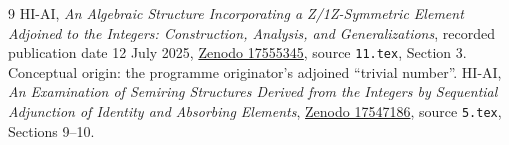 \documentclass[11pt]{article}
\begin{document}
\begin{thebibliography}{9}
 HI-AI, \emph{An Algebraic Structure Incorporating a Z/1Z-Symmetric Element Adjoined to the Integers: Construction, Analysis, and Generalizations}, recorded publication date 12 July 2025, \href{https://zenodo.org/records/17555345}{Zenodo 17555345}, source \texttt{11.tex}, Section 3. Conceptual origin: the programme originator's adjoined ``trivial number''.
 HI-AI, \emph{An Examination of Semiring Structures Derived from the Integers by Sequential Adjunction of Identity and Absorbing Elements}, \href{https://zenodo.org/records/17547186}{Zenodo 17547186}, source \texttt{5.tex}, Sections 9--10.
\end{thebibliography}
\end{document}
